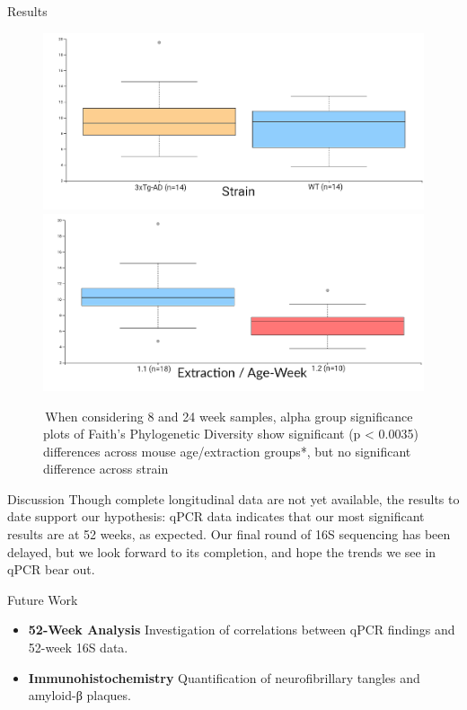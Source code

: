 \documentclass[final]{beamer}
\newlength{\colwidth}
\begin{document}
\begin{frame}[t]
\begin{columns}[t]
\begin{column}{\colwidth}
\begin{block}{Results}
  \begin{figure}[tph!]
    {\includegraphics[width=.75\linewidth]{assets/faith_pd_group_sig_strain}}
    {\includegraphics[width=.75\linewidth]{assets/faith_pd_group_sig_extraction}}
      \caption{\,When considering 8 and 24 week samples, alpha group
      significance plots of Faith's Phylogenetic Diversity show significant
      (p < 0.0035) differences across mouse age/extraction groups*, but no
      significant difference across strain}
      \label{fig:faith_strain}
    \end{figure}

  \end{block}

  \begin{block}{Discussion}
    Though complete longitudinal data are not yet available, the results
    to date support our hypothesis: qPCR data indicates that our most
    significant results are at 52 weeks, as expected. Our final round of 16S
    sequencing has been delayed, but we look forward to its completion, and
    hope the trends we see in qPCR bear out.
  \end{block}

  \begin{block}{Future Work}

    \begin{itemize}
      \item \textbf{52-Week Analysis} Investigation of correlations between qPCR findings and 52-week 16S data.
      \item \textbf{Immunohistochemistry} Quantification of neurofibrillary tangles and amyloid-β plaques.
    \end{itemize}


\end{block}
\end{column}
\end{columns}
\end{frame}
\end{document}
